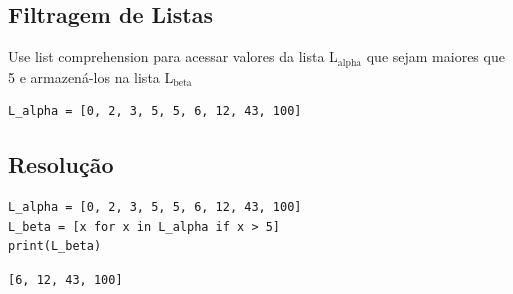 \documentclass[presentation]{beamer}
\begin{document}
\subsection{Filtragem de Listas}
\label{sec:orgheadline93}
Use list comprehension para acessar valores da lista L\(_{\text{alpha}}\) que sejam maiores que 5 e armazená-los na lista L\(_{\text{beta}}\)

\begin{verbatim}
L_alpha = [0, 2, 3, 5, 5, 6, 12, 43, 100]
\end{verbatim}
\subsection{Resolução}
\label{sec:orgheadline94}
\begin{verbatim}
L_alpha = [0, 2, 3, 5, 5, 6, 12, 43, 100]
L_beta = [x for x in L_alpha if x > 5]
print(L_beta)
\end{verbatim}

\begin{verbatim}
[6, 12, 43, 100]
\end{verbatim}
\end{document}
